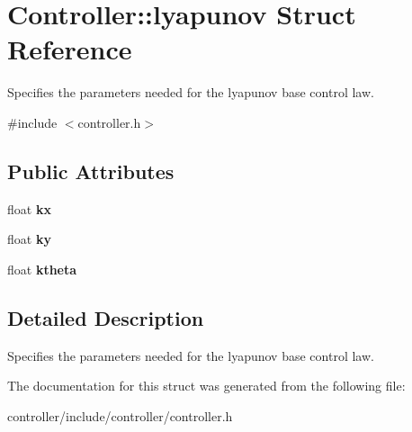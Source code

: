 \hypertarget{structController_1_1lyapunov}{}\section{Controller\+:\+:lyapunov Struct Reference}
\label{structController_1_1lyapunov}


Specifies the parameters needed for the lyapunov base control law.  




{\ttfamily \#include $<$controller.\+h$>$}

\subsection*{Public Attributes}
\begin{DoxyCompactItemize}
\item 
float {\bfseries kx}\hypertarget{structController_1_1lyapunov_a56b832234c79347ed03bdfa1f88aa530}{}\label{structController_1_1lyapunov_a56b832234c79347ed03bdfa1f88aa530}

\item 
float {\bfseries ky}\hypertarget{structController_1_1lyapunov_a3790be122f461506e1b7a30d8a2316a4}{}\label{structController_1_1lyapunov_a3790be122f461506e1b7a30d8a2316a4}

\item 
float {\bfseries ktheta}\hypertarget{structController_1_1lyapunov_acfdb5c6549627067f54273b7fbc6ac2b}{}\label{structController_1_1lyapunov_acfdb5c6549627067f54273b7fbc6ac2b}

\end{DoxyCompactItemize}


\subsection{Detailed Description}
Specifies the parameters needed for the lyapunov base control law. 

The documentation for this struct was generated from the following file\+:\begin{DoxyCompactItemize}
\item 
controller/include/controller/controller.\+h\end{DoxyCompactItemize}
